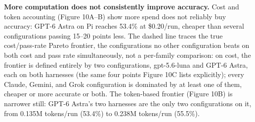 \documentclass[11pt]{article}
\begin{document}
\textbf{More computation does not consistently improve accuracy.} Cost and token accounting (Figure 10A--B) show more spend does not reliably buy accuracy: GPT-6 Astra on Pi reaches 53.4\% at \$0.20/run, cheaper than several configurations passing 15--20 points less. The dashed line traces the true cost/pass-rate Pareto frontier, the configurations no other configuration beats on both cost and pass rate simultaneously, not a per-family comparison: on cost, the frontier is defined entirely by two configurations, gpt-5.6-luna and GPT-6 Astra, each on both harnesses (the same four points Figure 10C lists explicitly); every Claude, Gemini, and Grok configuration is dominated by at least one of them, cheaper or more accurate or both. The token-based frontier (Figure 10B) is narrower still: GPT-6 Astra's two harnesses are the only two configurations on it, from 0.135M tokens/run (53.4\%) to 0.238M tokens/run (55.5\%).
\end{document}
